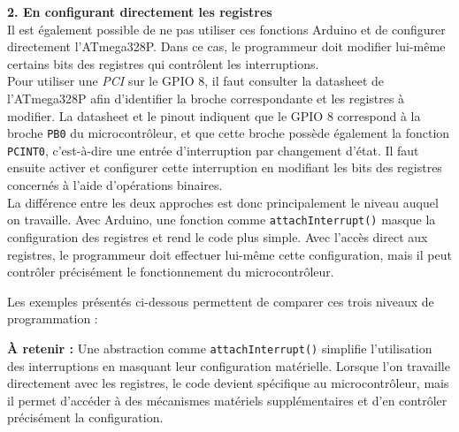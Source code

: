 \textbf{2. En configurant directement les registres}\\
Il est également possible de ne pas utiliser ces fonctions Arduino et de configurer directement l'ATmega328P. Dans ce cas, le programmeur doit modifier lui-même certains bits des registres qui contrôlent les interruptions.\\

Pour utiliser une \textit{PCI} sur le GPIO 8, il faut consulter la datasheet de l'ATmega328P afin d'identifier la broche correspondante et les registres à modifier. La datasheet et le pinout indiquent que le GPIO 8 correspond à la broche \texttt{PB0} du microcontrôleur, et que cette broche possède également la fonction \texttt{PCINT0}, c'est-à-dire une entrée d'interruption par changement d'état. Il faut ensuite activer et configurer cette interruption en modifiant les bits des registres concernés à l'aide d'opérations binaires.\\

La différence entre les deux approches est donc principalement le niveau auquel on travaille. Avec Arduino, une fonction comme \texttt{attachInterrupt()} masque la configuration des registres et rend le code plus simple. Avec l'accès direct aux registres, le programmeur doit effectuer lui-même cette configuration, mais il peut contrôler précisément le fonctionnement du microcontrôleur.



Les exemples présentés ci-dessous permettent de comparer ces trois niveaux de programmation :

\begin{center}
\qquad
{}
\qquad
{}
\end{center}


\begin{imp}
\textbf{À retenir :} Une abstraction comme \texttt{attachInterrupt()} simplifie l'utilisation des interruptions en masquant leur configuration matérielle. Lorsque l'on travaille directement avec les registres, le code devient spécifique au microcontrôleur, mais il permet d'accéder à des mécanismes matériels supplémentaires et d'en contrôler précisément la configuration.
\end{imp}

